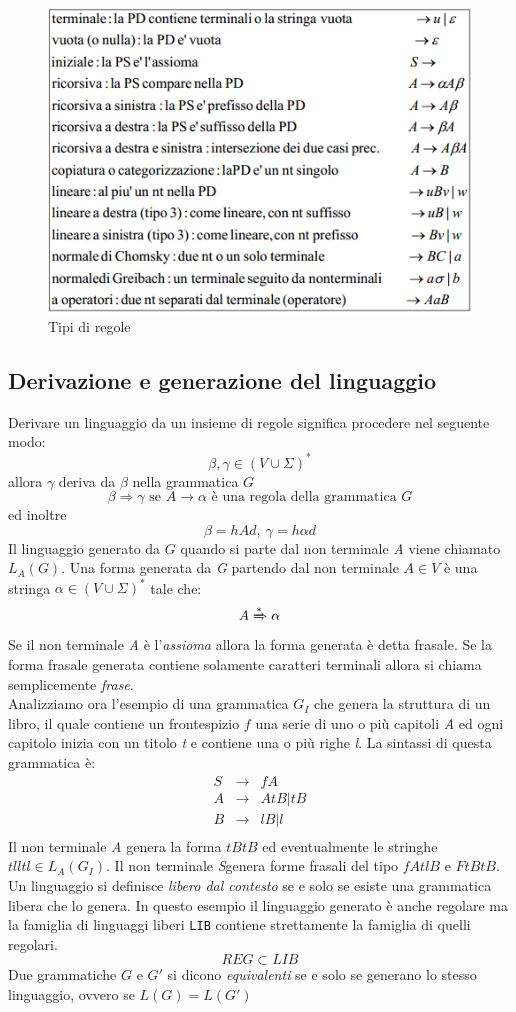 \begin{figure}
	\centering
	\includegraphics[width=0.6\linewidth]{img/tipiregole.png}
	\caption{Tipi di regole}\label{fig:tipiregole}
\end{figure}
\subsection{Derivazione e generazione del linguaggio}
Derivare un linguaggio da un insieme di regole significa procedere nel seguente modo:
$$\beta,\gamma \in (V\cup\Sigma)^*$$
allora $ \gamma $ deriva da $ \beta $ nella grammatica $ G $ 
$$ \beta \Rightarrow \gamma \text{ se } A\rightarrow \alpha \text{ è una regola della grammatica } G$$
ed inoltre
$$\beta = hAd, \ \gamma = h\alpha d$$
Il linguaggio generato da $ G $ quando si parte dal non terminale \emph{A} viene chiamato $ L_A(G) $. Una forma generata da \emph{G} partendo dal non terminale $ A \in V $ è una stringa $ \alpha \in (V\cup \Sigma)^*$ tale che:
$$A\xRightarrow{*}\alpha$$
Se il non terminale \emph{A} è l'\emph{assioma} allora la forma generata è detta frasale. Se la forma frasale generata contiene solamente caratteri terminali allora si chiama semplicemente \emph{frase}.\\
Analizziamo ora l'esempio di una grammatica $ G_I $ che genera la struttura di un libro, il quale contiene un frontespizio $ f $ una serie di uno o più capitoli \emph{A} ed ogni capitolo inizia con un titolo \emph{t} e contiene una o più righe \emph{l}.
La sintassi di questa grammatica è:
$$
\begin{array}{lcl}
S & \rightarrow & fA\\
A & \rightarrow & AtB | tB\\
B & \rightarrow & lB | l\\
\end{array}
$$
Il non terminale \emph{A} genera la forma $ tBtB $ ed eventualmente le stringhe $ tlltl \in L_A(G_I) $. Il non terminale \emph{S}genera forme frasali del tipo $ fAtlB $ e $ FtBtB $.
Un linguaggio si definisce \emph{libero dal contesto} se e solo se esiste una grammatica libera che lo  genera.
In questo esempio il linguaggio generato è anche regolare ma la famiglia di linguaggi liberi \texttt{LIB} contiene strettamente la famiglia di quelli regolari.
$$REG\subset LIB$$
Due grammatiche $ G $ e $ G' $ si dicono \emph{equivalenti} se e solo se generano lo stesso linguaggio, ovvero se $ L(G) = L(G') $
